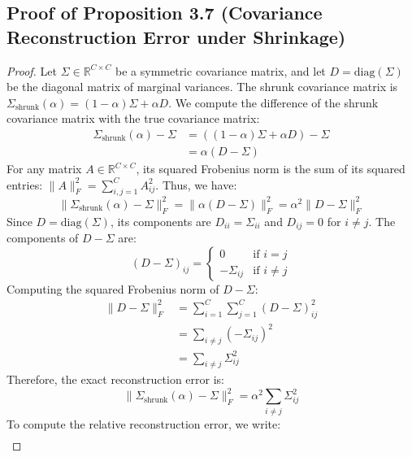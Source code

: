 \documentclass{article}
\theoremstyle{plain}
\theoremstyle{definition}
\theoremstyle{remark}
\begin{document}
\subsection{Proof of Proposition 3.7 (Covariance Reconstruction Error under Shrinkage)}
\label{sec:proofs_reconstruction_error}
\begin{proof}
Let $\Sigma \in \mathbb{R}^{C \times C}$ be a symmetric covariance matrix, and let $D = \text{diag}(\Sigma)$ be the diagonal matrix of marginal variances. The shrunk covariance matrix is $\Sigma_{\text{shrunk}}(\alpha) = (1 - \alpha) \Sigma + \alpha D$.
We compute the difference of the shrunk covariance matrix with the true covariance matrix:
\begin{align*}
  \Sigma_{\text{shrunk}}(\alpha) - \Sigma &= \left( (1 - \alpha) \Sigma + \alpha D \right) - \Sigma \\
  &= \alpha (D - \Sigma)
\end{align*}
For any matrix $A \in \mathbb{R}^{C \times C}$, its squared Frobenius norm is the sum of its squared entries: $\|A\|_F^2 = \sum_{i,j=1}^C A_{ij}^2$.
Thus, we have:
\begin{equation*}
  \big\| \Sigma_{\text{shrunk}}(\alpha) - \Sigma \big\|_F^2 = \big\| \alpha (D - \Sigma) \big\|_F^2 = \alpha^2 \big\| D - \Sigma \big\|_F^2
\end{equation*}
Since $D = \text{diag}(\Sigma)$, its components are $D_{ii} = \Sigma_{ii}$ and $D_{ij} = 0$ for $i \neq j$.
The components of $D - \Sigma$ are:
\begin{equation*}
  (D - \Sigma)_{ij} = \begin{cases} 0 & \text{if } i = j \\ -\Sigma_{ij} & \text{if } i \neq j \end{cases}
\end{equation*}
Computing the squared Frobenius norm of $D - \Sigma$:
\begin{align*}
  \big\| D - \Sigma \big\|_F^2 &= \sum_{i=1}^C \sum_{j=1}^C (D - \Sigma)_{ij}^2 \\
  &= \sum_{i \neq j} (-\Sigma_{ij})^2 \\
  &= \sum_{i \neq j} \Sigma_{ij}^2
\end{align*}
Therefore, the exact reconstruction error is:
\begin{equation}
  \big\| \Sigma_{\text{shrunk}}(\alpha) - \Sigma \big\|_F^2 = \alpha^2 \sum_{i \neq j} \Sigma_{ij}^2
\end{equation}
To compute the relative reconstruction error, we write:
\begin{align*}

\end{align*}
\end{proof}
\end{document}
